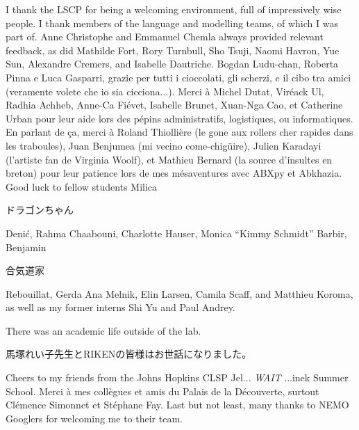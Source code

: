 \documentclass[12pt, twoside]{report}
\begin{document}
I thank the LSCP for being a welcoming environment, full of impressively wise people. I thank members of the language and modelling teams, of which I was part of. Anne Christophe and Emmanuel Chemla always provided relevant feedback, as did Mathilde Fort, Rory Turnbull, Sho Tsuji, Naomi Havron, Yue Sun, Alexandre Cremers, and Isabelle Dautriche. Bogdan Ludu-chan, Roberta Pinna e Luca Gasparri, grazie per tutti i cioccolati, gli scherzi, e il cibo tra amici (veramente volete che io sia cicciona...). Merci à Michel Dutat, Viréack Ul, Radhia Achheb, Anne-Ca Fiévet, Isabelle Brunet, Xuan-Nga Cao, et Catherine Urban pour leur aide lors des pépins administratifs, logistiques, ou informatiques. En parlant de ça, merci à Roland Thiollière (le gone aux rollers cher rapides dans les traboules), Juan Benjumea (mi vecino come-chigüire), Julien Karadayi (l'artiste fan de Virginia Woolf), et Mathieu Bernard (la source d'insultes en breton) pour leur patience lors de mes mésaventures avec ABXpy et Abkhazia. Good luck to fellow students Milica \begin{CJK}{UTF8}{min}ドラゴンちゃん\end{CJK} Denić, Rahma Chaabouni, Charlotte Hauser, Monica ``Kimmy Schmidt'' Barbir, Benjamin \begin{CJK}{UTF8}{min}合気道家\end{CJK} Rebouillat, Gerda Ana Melnik, Elin Larsen, Camila Scaff, and Matthieu Koroma, as well as my former interns Shi Yu and Paul Andrey.

There was an academic life outside of the lab. \begin{CJK}{UTF8}{min}馬塚れい子先生とRIKENの皆様はお世話になりました。\end{CJK} Cheers to my friends from the Johns Hopkins CLSP Jel... \textit{WAIT} ...inek Summer School. Merci à mes collègues et amis du Palais de la Découverte, surtout Clémence Simonnet et Stéphane Fay. Last but not least, many thanks to NEMO Googlers for welcoming me to their team. %
\end{document}
